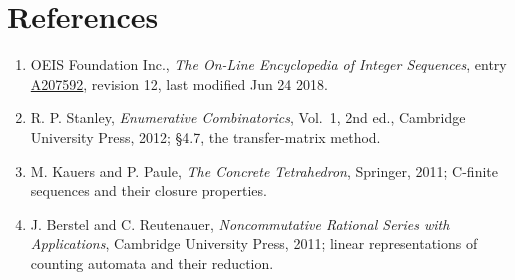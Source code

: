 \documentclass[11pt]{article}
\theoremstyle{definition}
\begin{document}
\section{References}

\begin{enumerate}

\item OEIS Foundation Inc., \emph{The On-Line Encyclopedia of Integer Sequences}, entry \href{https://oeis.org/A207592}{A207592}, revision 12, last modified Jun 24 2018.

\item R. P. Stanley, \emph{Enumerative Combinatorics}, Vol.~1, 2nd ed., Cambridge University Press, 2012; \S4.7, the transfer-matrix method.

\item M. Kauers and P. Paule, \emph{The Concrete Tetrahedron}, Springer, 2011; C-finite sequences and their closure properties.

\item J. Berstel and C. Reutenauer, \emph{Noncommutative Rational Series with Applications}, Cambridge University Press, 2011; linear representations of counting automata and their reduction.

\end{enumerate}
\end{document}
